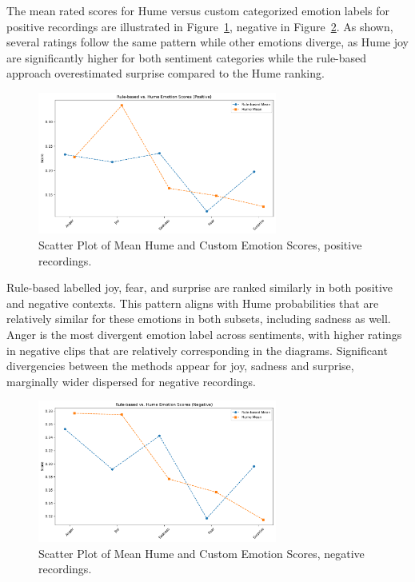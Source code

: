 The mean rated scores for Hume versus custom categorized emotion labels for positive recordings are illustrated in 
Figure~\ref{fig:rq1_scatter_custom_hume_pos}, negative in Figure~\ref{fig:rq1_scatter_custom_hume_neg}. As shown, several ratings follow the same 
pattern while other emotions diverge, as Hume joy are significantly higher for both sentiment categories while the rule-based approach overestimated surprise compared to the Hume ranking. 
\begin{figure}[H]
    \centering 
    \includegraphics[width=0.7\textwidth]{png/results/rq1_nr3/praat_hume_positive_scatter.pdf}
    \caption{Scatter Plot of Mean Hume and Custom Emotion Scores, positive recordings.}
    \label{fig:rq1_scatter_custom_hume_pos}
\end{figure}

Rule-based labelled joy, fear, and surprise are ranked similarly in both positive and negative contexts. This pattern aligns with Hume probabilities that are relatively similar for these emotions in both subsets, including sadness as well. 
Anger is the most divergent emotion label across sentiments, with higher ratings in negative clips that are relatively corresponding in the diagrams. Significant divergencies between the methods appear for joy, sadness and surprise, marginally wider dispersed for negative recordings. 
\begin{figure}[H]
    \centering 
    \includegraphics[width=0.7\textwidth]{png/results/rq1_nr3/praat_hume_negative_scatter.pdf}
    \caption{Scatter Plot of Mean Hume and Custom Emotion Scores, negative recordings.}
    \label{fig:rq1_scatter_custom_hume_neg}
\end{figure}


